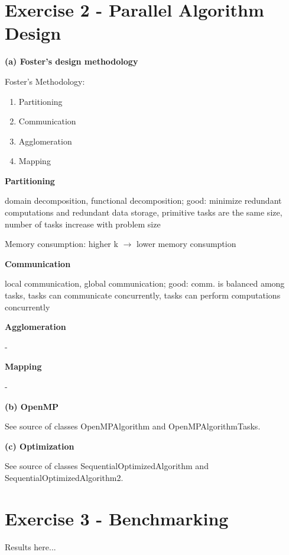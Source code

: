 \documentclass[a4paper,twoside,11pt]{article}
\begin{document}
\section{Exercise 2 - Parallel Algorithm Design}
\textbf{(a) Foster's design methodology}

Foster's Methodology:
\begin{enumerate}
	\item Partitioning
	\item Communication
	\item Agglomeration
	\item Mapping
\end{enumerate}

\textbf{Partitioning}

domain decomposition, functional decomposition; good: minimize redundant computations and redundant data storage, primitive tasks are the same size, number of tasks increase with problem size

Memory consumption: higher k $\rightarrow$ lower memory consumption

\textbf{Communication}

local communication, global communication; good: comm. is balanced among tasks, tasks can communicate concurrently, tasks can perform computations concurrently

\textbf{Agglomeration}

-

\textbf{Mapping}

-

\textbf{(b) OpenMP}

See source of classes OpenMPAlgorithm and OpenMPAlgorithmTasks.

\textbf{(c) Optimization}

See source of classes SequentialOptimizedAlgorithm and SequentialOptimizedAlgorithm2.

\section{Exercise 3 - Benchmarking}

Results here...
\end{document}
